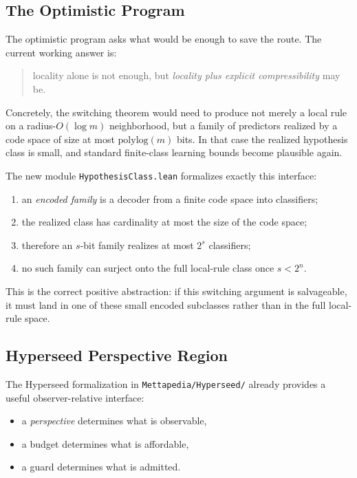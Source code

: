 \documentclass[11pt]{article}
\theoremstyle{remark}
\begin{document}
\subsection{The Optimistic Program}

The optimistic program asks what would be enough to save the route.
The current working answer is:
\begin{quote}
locality alone is not enough, but \emph{locality plus explicit compressibility} may be.
\end{quote}

Concretely, the switching theorem would need to produce not merely a local rule on a
radius-$O(\log m)$ neighborhood, but a family of predictors realized by a code space of
size at most \(\mathrm{polylog}(m)\) bits.  In that case the realized hypothesis class is
small, and standard finite-class learning bounds become plausible again.

The new module \texttt{HypothesisClass.lean} formalizes exactly this interface:
\begin{enumerate}[leftmargin=1.5em]
  \item an \emph{encoded family} is a decoder from a finite code space into classifiers;
  \item the realized class has cardinality at most the size of the code space;
  \item therefore an $s$-bit family realizes at most $2^s$ classifiers;
  \item no such family can surject onto the full local-rule class once $s < 2^n$.
\end{enumerate}

This is the correct positive abstraction: if this switching argument is salvageable, it must
land in one of these small encoded subclasses rather than in the full local-rule space.

\subsection{Hyperseed Perspective Region}

The Hyperseed formalization in \texttt{Mettapedia/Hyperseed/} already provides a useful
observer-relative interface:
\begin{itemize}[leftmargin=1.5em]
  \item a \emph{perspective} determines what is observable,
  \item a budget determines what is affordable,
  \item a guard determines what is admitted.
\end{itemize}
\end{document}
